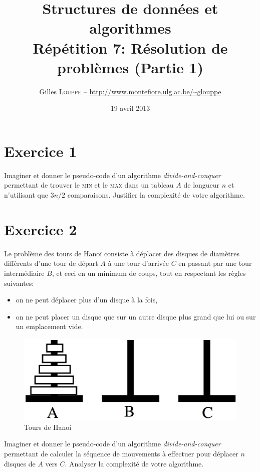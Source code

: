 \documentclass[a4paper,10pt]{article}
\title{
    \textbf{Structures de données et algorithmes}\\
    Répétition 7: Résolution de problèmes (Partie 1)
}
\author{Gilles \textsc{Louppe} -- \url{http://www.montefiore.ulg.ac.be/~glouppe}}
\date{19 avril 2013}
\begin{document}
\maketitle



\section*{Exercice 1}

Imaginer et donner le pseudo-code d'un algorithme \textit{divide-and-conquer}
permettant de trouver le \textsc{min} et le \textsc{max} dans un tableau $A$ de
longueur $n$ et n'utilisant que $3n/2$ comparaisons. Justifier la complexité de
votre algorithme.


\section*{Exercice 2}

Le problème des tours de Hanoï consiste à déplacer des disques de diamètres différents d'une tour de départ $A$ à une tour d'arrivée $C$ en passant par une tour intermédiaire $B$, et ceci en un minimum de coups, tout en respectant les règles suivantes:

\begin{itemize}
\item on ne peut déplacer plus d'un disque à la fois,
\item on ne peut placer un disque que sur un autre disque plus grand que lui ou sur un emplacement vide.
\end{itemize}

\begin{figure}[h]
    \center
    \includegraphics[scale=0.25]{hanoi.jpg}
    \caption{Tours de Hanoi}
\end{figure}

Imaginer et donner le pseudo-code d'un algorithme \textit{divide-and-conquer}
permettant de calculer la séquence de mouvements à effectuer pour déplacer $n$
disques de $A$ vers $C$. Analyser la complexité de votre algorithme.
\end{document}
